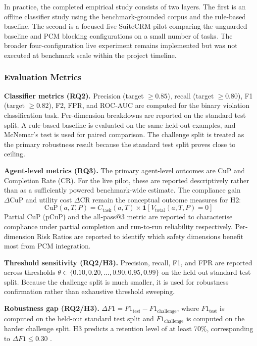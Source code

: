 \documentclass[12pt,a4paper]{article}
\begin{document}
In practice, the completed empirical study consists of two layers. The first is
an offline classifier study using the benchmark-grounded corpus and the
rule-based baseline. The second is a focused live SuiteCRM pilot comparing the
unguarded baseline and PCM blocking configurations on a small number of tasks.
The broader four-configuration live experiment remains implemented but was not
executed at benchmark scale within the project timeline.

\subsubsection{Evaluation Metrics}

\textbf{Classifier metrics (RQ2).}
Precision (target $\geq 0.85$), recall (target $\geq 0.80$), F1 (target
$\geq 0.82$), F2, FPR, and ROC-AUC are computed for the binary violation
classification task. Per-dimension breakdowns are reported on the standard test
split. A rule-based baseline is evaluated on the same held-out examples, and
McNemar's test is used for paired comparison. The challenge split is treated as
the primary robustness result because the standard test split proves close to
ceiling.

\textbf{Agent-level metrics (RQ3).}
The primary agent-level outcomes are CuP and Completion Rate (CR). For the live
pilot, these are reported descriptively rather than as a sufficiently powered
benchmark-wide estimate. The compliance gain $\Delta\text{CuP}$ and utility cost
$\Delta\text{CR}$ remain the conceptual outcome measures for H2:
\begin{equation}
  \text{CuP}(a, T, P) = C_{\text{task}}(a,T) \times
  \mathbf{1}\!\left[V_{\text{total}}(a,T,P) = 0\right]
\end{equation}
Partial CuP (pCuP) and the all-pass@3 metric are reported to characterise
compliance under partial completion and run-to-run reliability respectively.
Per-dimension Risk Ratios are reported to identify which safety dimensions benefit
most from PCM integration.

\textbf{Threshold sensitivity (RQ2/H3).}
Precision, recall, F1, and FPR are reported across thresholds
$\theta \in \{0.10, 0.20, \ldots, 0.90, 0.95, 0.99\}$ on the held-out standard
test split. Because the challenge split is much smaller, it is used for
robustness confirmation rather than exhaustive threshold sweeping.

\textbf{Robustness gap (RQ2/H3).}
$\Delta F1 = F1_{\text{test}} - F1_{\text{challenge}}$, where
$F1_{\text{test}}$ is computed on the held-out standard test split and
$F1_{\text{challenge}}$ is computed on the harder challenge split. H3 predicts a
retention level of at least 70\%, corresponding to $\Delta F1 \leq 0.30$
\citep{li2023synthetic}.
\end{document}

